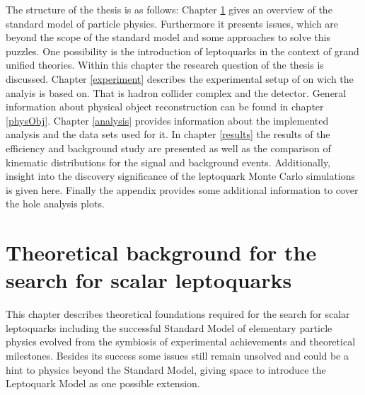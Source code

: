 The structure of the thesis is as follows: Chapter \ref{theory} gives an overview of the standard model of particle physics. Furthermore it presents issues, which are beyond the scope of the standard model and some approaches to solve this puzzles. One possibility is the introduction of leptoquarks in the context of grand unified theories. Within this chapter the research question of the thesis is discussed. Chapter \ref{experiment} describes the experimental setup of on wich the analyis is based on. That is hadron collider complex {\LHC} and the {\ATLAS} detector. General information about physical object reconstruction can be found in chapter \ref{physObj}. Chapter \ref{analysis} provides information about the implemented analysis and the data sets used for it. In chapter \ref{results} the results of the efficiency and background study are presented as well as the comparison of kinematic distributions for the signal and background events. Additionally, insight into the discovery significance of the leptoquark Monte Carlo simulations is given here. Finally the appendix provides some additional information to cover the hole analysis plots. 
\chapter{Theoretical background for the search for scalar leptoquarks}\label{theory}
This chapter describes theoretical foundations required for the search for scalar leptoquarks including the successful Standard Model of elementary particle physics evolved from the symbiosis of experimental achievements and theoretical milestones. Besides its success some issues still remain unsolved and could be a hint to physics beyond the Standard Model, giving space to introduce the Leptoquark Model as one possible extension. 
